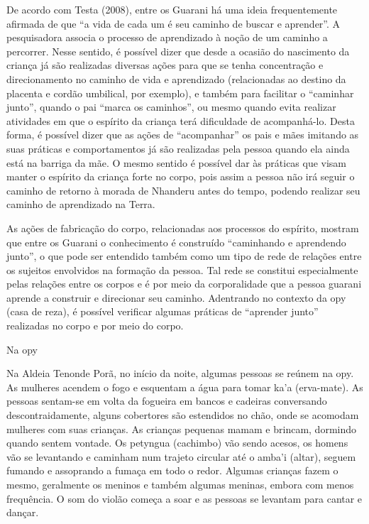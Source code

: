 \documentclass{article}
\begin{document}
De acordo com Testa (2008), entre os Guarani h\'a uma ideia
frequentemente afirmada de que {\textquotedblleft}a vida de cada um \'e
seu caminho de buscar e aprender{\textquotedblright}. A pesquisadora
associa o processo de aprendizado \`a no\c{c}\~ao de um caminho a
percorrer. Nesse sentido, \'e poss\'ivel dizer que desde a ocasi\~ao do
nascimento da crian\c{c}a j\'a s\~ao realizadas diversas a\c{c}\~oes
para que se tenha concentra\c{c}\~ao e direcionamento no caminho de
vida e aprendizado (relacionadas ao destino da placenta e cord\~ao
umbilical, por exemplo), e tamb\'em para facilitar o
{\textquotedblleft}caminhar junto{\textquotedblright}, quando o pai
{\textquotedblleft}marca os caminhos{\textquotedblright}, ou mesmo
quando evita realizar atividades em que o esp\'irito da crian\c{c}a
ter\'a dificuldade de acompanh\'a-lo. Desta forma, \'e poss\'ivel dizer
que as a\c{c}\~oes de {\textquotedblleft}acompanhar{\textquotedblright}
os pais e m\~aes imitando as suas pr\'aticas e comportamentos j\'a
s\~ao realizadas pela pessoa quando ela ainda est\'a na barriga da
m\~ae. O mesmo sentido \'e poss\'ivel dar \`as pr\'aticas que visam
manter o esp\'irito da crian\c{c}a forte no corpo, pois assim a pessoa
n\~ao ir\'a seguir o caminho de retorno \`a morada de Nhanderu antes do
tempo, podendo realizar seu caminho de aprendizado na Terra. 

As a\c{c}\~oes de fabrica\c{c}\~ao do corpo, relacionadas aos processos
do esp\'irito, mostram que entre os Guarani o conhecimento \'e
constru\'ido {\textquotedblleft}caminhando e aprendendo
junto{\textquotedblright}, o que pode ser entendido tamb\'em como um
tipo de rede de rela\c{c}\~oes entre os sujeitos envolvidos na
forma\c{c}\~ao da pessoa. Tal rede se constitui especialmente pelas
rela\c{c}\~oes entre os corpos e \'e por meio da corporalidade que a
pessoa guarani aprende a construir e direcionar seu caminho. Adentrando
no contexto da opy (casa de reza), \'e poss\'ivel verificar algumas
pr\'aticas de {\textquotedblleft}aprender junto{\textquotedblright}
realizadas no corpo e por meio do corpo.

Na opy

Na Aldeia Tenonde Por\~a, no in\'icio da noite, algumas pessoas se
re\'unem na opy.  As mulheres acendem o fogo e esquentam a \'agua para
tomar ka{\textquoteright}a (erva-mate). As pessoas sentam-se em volta
da fogueira em bancos e cadeiras conversando descontraidamente, alguns
cobertores s\~ao estendidos no ch\~ao, onde se acomodam mulheres com
suas crian\c{c}as. As crian\c{c}as pequenas mamam e brincam, dormindo
quando sentem vontade. Os petyngua (cachimbo) v\~ao sendo acesos, os
homens v\~ao se levantando e caminham num trajeto circular at\'e o
amba{\textquoteright}i (altar), seguem fumando e assoprando a
fuma\c{c}a em todo o redor. Algumas crian\c{c}as fazem o mesmo,
geralmente os meninos e tamb\'em algumas meninas, embora com menos
frequ\^encia. O som do viol\~ao come\c{c}a a soar e as pessoas se
levantam para cantar e dan\c{c}ar. 
\end{document}
